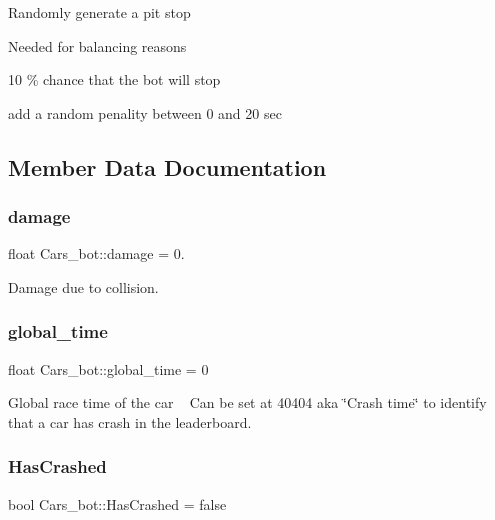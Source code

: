 Randomly generate a pit stop

Needed for balancing reasons

10 \% chance that the bot will stop

add a random penality between 0 and 20 sec 

\subsection{Member Data Documentation}
\mbox{\label{class_cars__bot_a358a371bdfed0782a07a958b7868b0e2}} 
\subsubsection{\texorpdfstring{damage}{damage}}
{\footnotesize\ttfamily float Cars\+\_\+bot\+::damage = 0.}



Damage due to collision. 

\mbox{\label{class_cars__bot_ad58234570f5051e4a607da5351cf1b78}} 
\subsubsection{\texorpdfstring{global\+\_\+time}{global\_time}}
{\footnotesize\ttfamily float Cars\+\_\+bot\+::global\+\_\+time = 0}



Global race time of the car ~\newline
 Can be set at 40404 aka \char`\"{}\+Crash time\char`\"{} to identify that a car has crash in the leaderboard. 

\mbox{\label{class_cars__bot_a727a25c57ca410c714bf66edf809b469}} 
\subsubsection{\texorpdfstring{Has\+Crashed}{HasCrashed}}
{\footnotesize\ttfamily bool Cars\+\_\+bot\+::\+Has\+Crashed = false}




